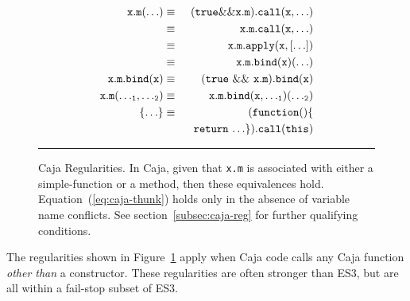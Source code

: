 \documentclass[letterpaper,twocolumn,10pt]{article}
\newcommand{\code}[1]{{\tt {#1}}}              %
\begin{document}
\begin{figure}
\begin{eqnarray}
  \code{x.m(\ldots)}         & \equiv & \code{(true \&\& x.m).call(x,\ldots)}         \label{eq:caja-true-call} \\
                             & \equiv & \code{x.m.call(x,\ldots)}                     \label{eq:caja-call} \\
                             & \equiv & \code{x.m.apply(x,[\ldots])}                  \label{eq:caja-apply} \\
                             & \equiv & \code{x.m.bind(x)(\ldots)}                    \label{eq:caja-bind-1} \\
  \code{x.m.bind(x)}         & \equiv & \code{(true\ \&\&\ x.m).bind(x)}              \label{eq:caja-true-bind} \\ 
  \code{x.m({\ldots}_1,{\ldots}_2)} 
                             & \equiv & \code{x.m.bind(x,{\ldots}_1)({\ldots}_2)}     \label{eq:caja-bind-n} \\
  \code{\{{\ldots}\}}        & \equiv & \code{(function()\{}                          \label{eq:caja-thunk} \\
                             &        & \code{\ \ return\ {\ldots\}}).call(this)}     \nonumber
\end{eqnarray}

\caption[Caja Regularities.]{Caja Regularities. In Caja, given that \code{x.m} is associated with either a 
simple-function or a method, then these equivalences hold. Equation~(\ref{eq:caja-thunk}) holds only in the absence 
of variable name conflicts. See section~\ref{subsec:caja-reg} for further qualifying conditions. \\ } \hrule
\label{eqn:caja-regularities}
\end{figure}

The regularities shown in Figure~\ref{eqn:caja-regularities} apply when Caja code calls any Caja function 
\emph{other than} a constructor. These regularities are often stronger than 
ES3, but are all within a fail-stop subset of ES3. 
\end{document}
